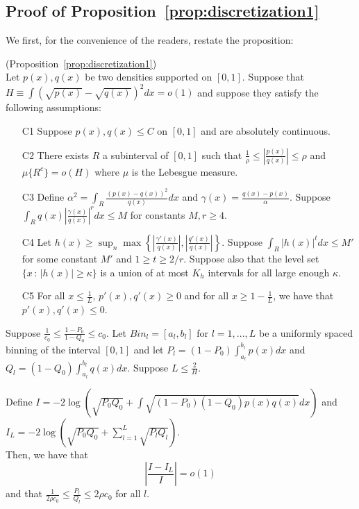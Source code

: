 
\subsection{Proof of Proposition~\ref{prop:discretization1}}

We first, for the convenience of the readers, restate the proposition:

\begin{proposition} (Proposition~\ref{prop:discretization1})\\
Let $p(x), q(x)$ be two densities supported on $[0,1]$. Suppose that $H \equiv \int (\sqrt{p(x)} - \sqrt{q(x)})^2 dx = o(1)$ and suppose they satisfy the following assumptions:

\begin{enumerate}
\item[C1] Suppose $p(x), q(x) \leq C$ on $[0,1]$ and are absolutely continuous.
\item[C2] There exists $R$ a subinterval of $[0,1]$ such that $\frac{1}{\rho} \leq \left| \frac{p(x)}{q(x)} \right| \leq \rho$ and $\mu\{R^c\} = o(H)$ where $\mu$ is the Lebesgue measure.

\item[C3] Define $\alpha^2 = \int_R \frac{(p(x) - q(x))^2}{q(x)} dx$ and $\gamma(x) = \frac{q(x) - p(x)}{\alpha}$. Suppose $\int_R q(x) \left| \frac{\gamma(x)}{q(x)} \right|^r dx  \leq M$ for constants $M, r \geq 4$.
\item[C4] Let $h(x) \geq \sup_n \max \left\{  \left|\frac{\gamma'(x)}{q(x)} \right|, 
 \left|\frac{q'(x)}{q(x)}\right|  \right\} $. Suppose $\int_R |h(x)|^t dx \leq M'$ for some constant $M'$ and $1 \geq t \geq 2/r$. Suppose also that the level set $\{x \,:\, |h(x)| \geq \kappa\}$ is a union of at most $K_h$ intervals for all large enough $\kappa$.  
\item[C5] For all $x \leq \frac{1}{L}$, $p'(x), q'(x) \geq 0$ and for all $x \geq 1 - \frac{1}{L}$, we have that $p'(x), q'(x) \leq 0$.
\end{enumerate}

Suppose $\frac{1}{c_0} \leq \frac{1 - P_0}{1-Q_0} \leq c_0$. Let $Bin_l = [a_l, b_l]$ for $l=1,...,L$ be a uniformly spaced binning of the interval $[0,1]$ and let $P_l = (1- P_0) \int_{a_l}^{b_l} p(x) dx$ and $Q_l = (1-Q_0)\int_{a_l}^{b_l} q(x) dx$. Suppose $L \leq \frac{2}{H}$.

Define $I = -2 \log \left( \sqrt{P_0 Q_0} + \int \sqrt{(1-P_0)(1-Q_0) p(x) q(x)} dx \right)$ and $I_L = -2 \log \left( \sqrt{P_0 Q_0} + \sum_{l=1}^L \sqrt{P_l Q_l} \right)$. \\

Then, we have that
 $$\left| \frac{I - I_L}{I} \right| = o(1)$$ 
and that $\frac{1}{2\rho c_0} \leq \frac{P_l}{Q_l} \leq 2\rho c_0$ for all $l$. 

\end{proposition}


